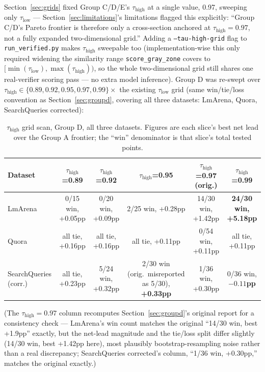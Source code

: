 \documentclass[11pt]{article}
\newcommand{\taulow}{\ensuremath{\tau_{\text{low}}}}
\newenvironment{fittab}{\begin{lrbox}{\fittabbox}}{\end{lrbox}%
  \ifdim\wd\fittabbox>\linewidth\resizebox{\linewidth}{!}{\usebox{\fittabbox}}\else\usebox{\fittabbox}\fi}
\newcommand{\tauhigh}{\ensuremath{\tau_{\text{high}}}}
\begin{document}
Section~\ref{sec:grids} fixed Group C/D/E's $\tauhigh$ at a single value, 0.97, sweeping only $\taulow$ --- Section~\ref{sec:limitations}'s limitations flagged this explicitly: ``Group C/D's Pareto frontier is therefore only a cross-section anchored at $\tauhigh = 0.97$, not a fully expanded two-dimensional grid.'' Adding a \texttt{--tau-high-grid} flag to \texttt{run\_\allowbreak{}verified.\allowbreak{}py} makes $\tauhigh$ sweepable too (implementation-wise this only required widening the similarity range \texttt{score\_\allowbreak{}gray\_\allowbreak{}zone} covers to $[\min(\taulow), \max(\tauhigh))$, so the whole two-dimensional grid still shares one real-verifier scoring pass --- no extra model inference). Group D was re-swept over $\tauhigh \in \{0.89, 0.92, 0.95, 0.97, 0.99\} \times$ the existing $\taulow$ grid (same win/tie/loss convention as Section~\ref{sec:groupd}, covering all three datasets: LmArena, Quora, SearchQueries corrected):

\begin{table}[h]
\centering
\small
\begin{fittab}\begin{tabular}{@{}lccccc@{}}
\toprule
\textbf{Dataset} & $\tauhigh$\textbf{=0.89} & $\tauhigh$\textbf{=0.92} & $\tauhigh$\textbf{=0.95} & $\tauhigh$\textbf{=0.97 (orig.)} & $\tauhigh$\textbf{=0.99} \\
\midrule
LmArena & 0/15 win, +0.05pp & 0/20 win, +0.09pp & 2/25 win, +0.28pp & 14/30 win, +1.42pp & \textbf{24/30 win, +5.18pp} \\
Quora & all tie, +0.16pp & all tie, +0.16pp & all tie, +0.11pp & 0/54 win, +0.11pp & all tie, +0.11pp \\
SearchQueries (corr.) & all tie, +0.23pp & 5/24 win, +0.32pp & 2/30 win (orig.\ misreported as 5/30), \textbf{+0.33pp} & 1/36 win, +0.30pp & 0/36 win, \textbf{$-0.11$pp} \\
\bottomrule
\end{tabular}\end{fittab}
\caption{$\tauhigh$ grid scan, Group D, all three datasets. Figures are each slice's best net lead over the Group A frontier; the ``win'' denominator is that slice's total tested points.}
\end{table}

(The $\tauhigh=0.97$ column recomputes Section~\ref{sec:groupd}'s original report for a consistency check --- LmArena's win count matches the original ``14/30 win, best +1.9pp'' exactly, but the net-lead magnitude and the tie/loss split differ slightly (14/30 win, best +1.42pp here), most plausibly bootstrap-resampling noise rather than a real discrepancy; SearchQueries corrected's column, ``1/36 win, +0.30pp,'' matches the original exactly.)
\end{document}
